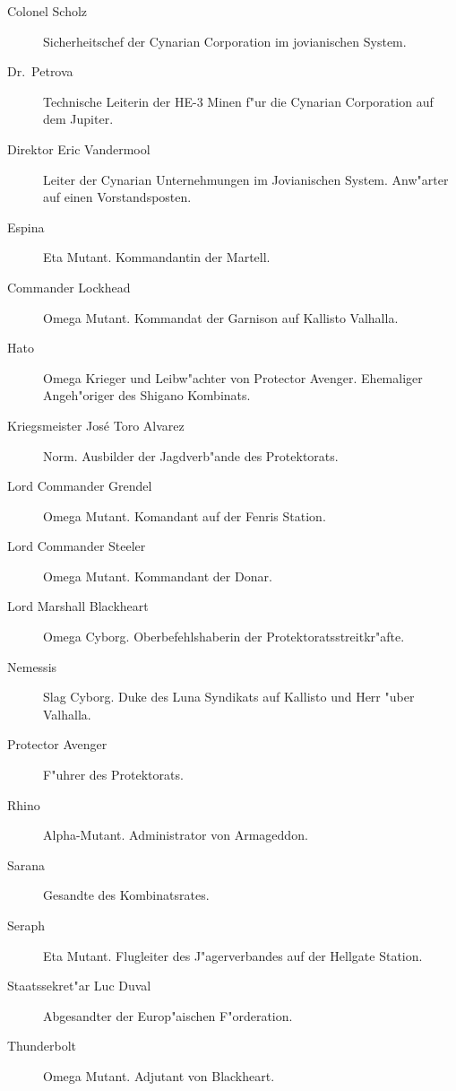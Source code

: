 
\begin{description}
\item [Colonel Scholz] Sicherheitschef der Cynarian Corporation im jovianischen System.
\item [Dr.~Petrova] Technische Leiterin der HE-3 Minen f"ur die Cynarian Corporation auf dem Jupiter.
\item [Direktor Eric Vandermool] Leiter der Cynarian Unternehmungen im Jovianischen System. Anw"arter auf einen
      Vorstandsposten.
\item [Espina] Eta Mutant. Kommandantin der Martell.
\item [Commander Lockhead] Omega Mutant. Kommandat der Garnison auf Kallisto Valhalla.
\item [Hato] Omega Krieger und Leibw"achter von Protector Avenger. Ehemaliger Angeh"origer des Shigano Kombinats.
\item [Kriegsmeister Jos\'{e} \frqq{}Toro\flqq{} Alvarez] Norm. Ausbilder der Jagdverb"ande des Protektorats.
\item [Lord Commander Grendel] Omega Mutant. Komandant auf der Fenris Station.
\item [Lord Commander Steeler] Omega Mutant. Kommandant der Donar.
\item [Lord Marshall Blackheart] Omega Cyborg. Oberbefehlshaberin der Protektoratsstreitkr"afte.
\item [Nemessis] Slag Cyborg. Duke des Luna Syndikats auf Kallisto und Herr "uber Valhalla.
\item [Protector Avenger] F"uhrer des Protektorats.
\item [Rhino] Alpha-Mutant. Administrator von Armageddon.
\item [Sarana] Gesandte des Kombinatsrates.
\item [Seraph] Eta Mutant. Flugleiter des J"agerverbandes auf der Hellgate Station.
\item [Staatssekret"ar Luc Duval] Abgesandter der Europ"aischen F"orderation.
\item [Thunderbolt] Omega Mutant. Adjutant von Blackheart.
\end{description}